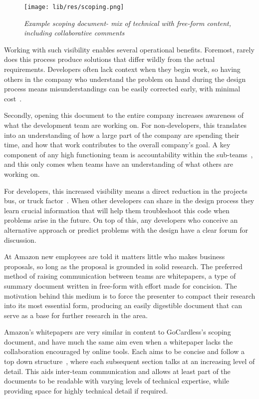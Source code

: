 \documentclass[11pt]{article}
\begin{document}
\begin{figure}
\centering
\texttt{[image: lib/res/scoping.png]}
\caption{\label{fig:scoping}\textit{Example scoping document- mix of technical with
free-form content, including collaborative comments}}
\end{figure}

Working with such visibility enables several operational benefits. Foremost,
rarely does this process produce solutions that differ wildly from the actual
requirements. Developers often lack context when they begin work, so having
others in the company who understand the problem on hand during the design
process means misunderstandings can be easily corrected early, with minimal
cost~\cite{costOfChangeEssay}.

Secondly, opening this document to the entire company increases awareness of
what the development team are working on. For non-developers, this translates
into an understanding of how a large part of the company are spending their
time, and how that work contributes to the overall company's goal. A key
component of any high functioning team is accountability within the
sub-teams~\cite{fiveDysfunctions}, and this only comes when teams have an
understanding of what others are working on.

For developers, this increased visibility means a direct reduction in the
projects bus, or truck factor~\cite{truckFactor}. When other developers can share
in the design process they learn crucial information that will help them
troubleshoot this code when problems arise in the future. On top of this, any
developers who conceive an alternative approach or predict problems with the
design have a clear forum for discussion.

At Amazon new employees are told it matters little who makes business proposals,
so long as the proposal is grounded in solid research. The preferred method of
raising communication between teams are whitepapers, a type of summary document
written in free-form with effort made for concision. The motivation behind this
medium is to force the presenter to compact their research into its most
essential form, producing an easily digestible document that can serve as a base
for further research in the area.

Amazon's whitepapers are very similar in content to GoCardless's scoping
document, and have much the same aim even when a whitepaper lacks the
collaboration encouraged by online tools. Each aims to be concise and follow a
top down structure~\cite{reportingAndWriting}, where each subsequent section
talks at an increasing level of detail. This aids inter-team communication and
allows at least part of the documents to be readable with varying levels of
technical expertise, while providing space for highly technical detail if
required.
\end{document}
